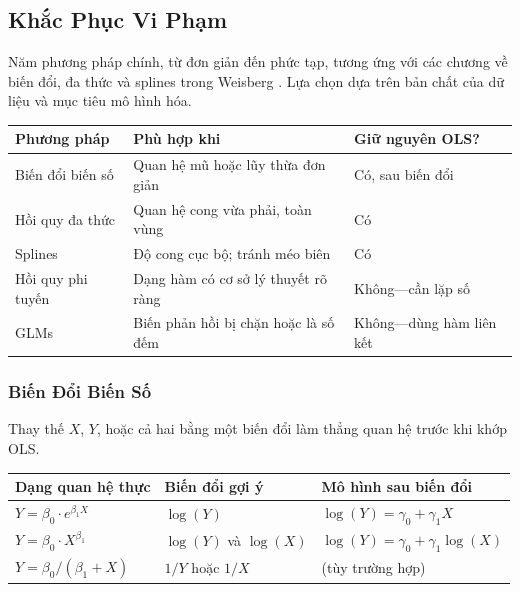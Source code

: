 \subsection{Khắc Phục Vi Phạm}

Năm phương pháp chính, từ đơn giản đến phức tạp, tương ứng với các chương về biến đổi, đa thức và splines trong Weisberg \cite[Ch.~5; Ch.~8]{weisberg2014applied}. Lựa chọn dựa trên bản chất của dữ liệu và mục tiêu mô hình hóa.

\begin{center}
\begin{tabular}{@{}lp{5.2cm}l@{}}
\toprule
\textbf{Phương pháp} & \textbf{Phù hợp khi} & \textbf{Giữ nguyên OLS?} \\
\midrule
Biến đổi biến số    & Quan hệ mũ hoặc lũy thừa đơn giản         & Có, sau biến đổi \\
Hồi quy đa thức     & Quan hệ cong vừa phải, toàn vùng           & Có \\
Splines             & Độ cong cục bộ; tránh méo biên              & Có \\
Hồi quy phi tuyến  & Dạng hàm có cơ sở lý thuyết rõ ràng        & Không---cần lặp số \\
GLMs                & Biến phản hồi bị chặn hoặc là số đếm       & Không---dùng hàm liên kết \\
\bottomrule
\end{tabular}
\end{center}

\subsubsection{Biến Đổi Biến Số}

Thay thế $X$, $Y$, hoặc cả hai bằng một biến đổi làm thẳng quan hệ trước khi khớp OLS.

\begin{center}
\begin{tabular}{@{}lll@{}}
\toprule
\textbf{Dạng quan hệ thực} & \textbf{Biến đổi gợi ý} & \textbf{Mô hình sau biến đổi} \\
\midrule
$Y = \beta_0 \cdot e^{\beta_1 X}$ & $\log(Y)$ & $\log(Y) = \gamma_0 + \gamma_1 X$ \\
$Y = \beta_0 \cdot X^{\beta_1}$   & $\log(Y)$ và $\log(X)$ & $\log(Y) = \gamma_0 + \gamma_1\log(X)$ \\
$Y = \beta_0 / (\beta_1 + X)$     & $1/Y$ hoặc $1/X$ & (tùy trường hợp) \\
\bottomrule
\end{tabular}
\end{center}

